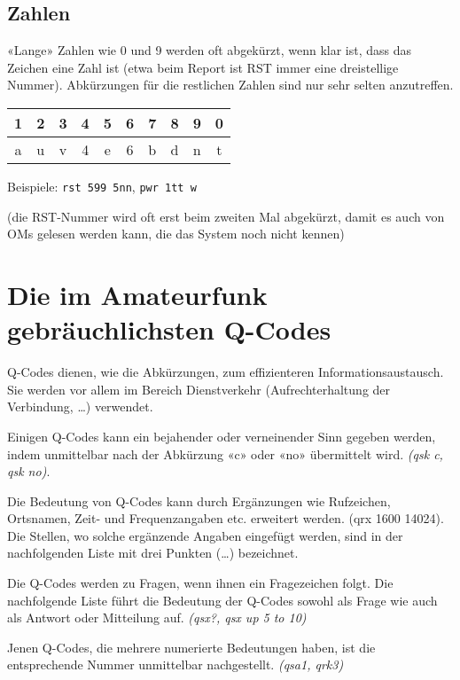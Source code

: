 \subsection{Zahlen}
«Lange» Zahlen wie 0 und 9 werden oft abgekürzt, wenn klar ist, dass das Zeichen eine Zahl ist (etwa beim Report ist RST immer eine dreistellige Nummer). Abkürzungen für die restlichen Zahlen sind nur sehr selten anzutreffen.

\vspace{1em}
{
\begin{tabular}{cccccccccc}
1 & 2 & 3 & 4 & 5 & 6 & 7 & 8 & 9 & 0 \\
\toprule
a & u & v & 4 & e & 6 & b & d & n & t
\end{tabular}
}
\vspace{1em}

Beispiele: \texttt{rst 599 5nn}, \texttt{pwr 1tt w}

(die RST-Nummer wird oft erst beim zweiten Mal abgekürzt, damit es auch von OMs gelesen werden kann, die das System noch nicht kennen)

\section{Die im Amateurfunk gebräuchlichsten Q-Codes}\label{sec:qcodes}
Q-Codes dienen, wie die Abkürzungen, zum effizienteren Informationsaustausch. Sie werden vor allem im Bereich Dienstverkehr (Aufrechterhaltung der Verbindung, …) verwendet.

Einigen Q-Codes kann ein bejahender oder verneinender Sinn gegeben werden, indem unmittelbar nach der Abkürzung «c» oder «no» übermittelt wird. \textit{(qsk c, qsk no)}.

Die Bedeutung von Q-Codes kann durch Ergänzungen wie Rufzeichen, Ortsnamen, Zeit- und Frequenzangaben etc. erweitert werden. (qrx 1600 14024). Die Stellen, wo solche ergänzende Angaben eingefügt werden, sind in der nachfolgenden Liste mit drei Punkten (…) bezeichnet. 

Die Q-Codes werden zu Fragen, wenn ihnen ein Fragezeichen folgt. Die nachfolgende Liste führt die Bedeutung der Q-Codes sowohl als Frage wie auch als Antwort oder Mitteilung auf. \textit{(qsx?, qsx up 5 to 10)}

Jenen Q-Codes, die mehrere numerierte Bedeutungen haben, ist die entsprechende Nummer unmittelbar nachgestellt. \textit{(qsa1, qrk3)}

